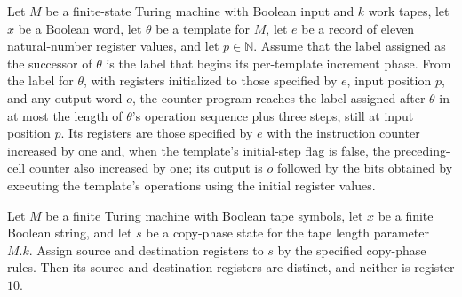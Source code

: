 \begin{theorem}
\label{Complexity.UTab.goes_instr}
\leanok
{}
Let $M$ be a finite-state Turing machine with Boolean input and $k$ work tapes, let $x$
be a Boolean word, let $\theta$ be a template for $M$, let $e$ be a record of eleven
natural-number register values, and let $p\in\mathbb{N}$. Assume that the label assigned
as the successor of $\theta$ is the label that begins its per-template increment phase.
From the label for $\theta$, with registers initialized to those specified by $e$, input
position $p$, and any output word $o$, the counter program reaches the label assigned
after $\theta$ in at most the length of $\theta$'s operation sequence plus three steps,
still at input position $p$. Its registers are those specified by $e$ with the
instruction counter increased by one and, when the template's initial-step flag is
false, the preceding-cell counter also increased by one; its output is $o$ followed by
the bits obtained by executing the template's operations using the initial register
values.
\end{theorem}

\begin{theorem}
\label{Complexity.UTab.CpS.regs_ne}
\leanok
{}
Let $M$ be a finite Turing machine with Boolean tape symbols, let $x$ be a finite
Boolean string, and let $s$ be a copy-phase state for the tape length parameter $M.k$.
Assign source and destination registers to $s$ by the specified copy-phase rules. Then
its source and destination registers are distinct, and neither is register $10$.
\end{theorem}

